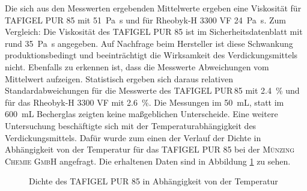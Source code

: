 Die sich aus den Messwerten ergebenden Mittelwerte ergeben eine Viskosität für TAFIGEL PUR 85 mit \SI{51}{\pascal \second} und für Rheobyk-H 3300 VF \SI{24}{\pascal \second}. Zum Vergleich: Die Viskosität des TAFIGEL PUR 85 ist im Sicherheitsdatenblatt mit rund \SI{35}{\pascal \second}  angegeben. Auf Nachfrage beim Hersteller ist diese Schwankung produktionsbedingt und beeinträchtigt die Wirksamkeit des Verdickungsmittels nicht. \cite{MunzingChemieGmbH.2020} Ebenfalls zu erkennen ist, dass die Messwerte Abweichungen vom Mittelwert aufzeigen. Statistisch ergeben sich daraus relativen Standardabweichungen für die Messwerte des TAFIGEL PUR\,85 mit \SI{2,4}{\percent} und für das Rheobyk-H 3300 VF mit \SI{2,6}{\percent}. Die Messungen im \SI{50}{\milli \liter}, statt im \SI{600}{\milli \liter} Becherglas zeigten keine maßgeblichen Unterscheide.\linebreak
Eine weitere Untersuchung beschäftigte sich mit der Temperaturabhängigkeit des Verdickungsmittels. Dafür wurde zum einen der Verlauf der Dichte in Abhängigkeit von der Temperatur für das TAFIGEL PUR 85 bei der \textsc{Münzing Chemie GmbH} angefragt. Die erhaltenen Daten sind in Abbildung \ref{dia:dichte} zu sehen.


\begin{figure}[h]
	\begin{center}
		\caption{Dichte des TAFIGEL PUR 85 in Abhängigkeit von der Temperatur}
		\label{dia:dichte}
	\end{center}
\end{figure} 

